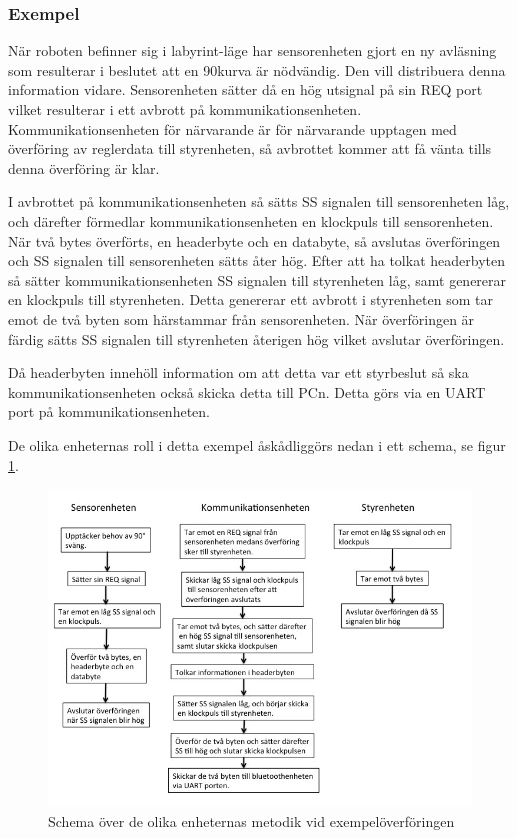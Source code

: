 \subsubsection{Exempel}

När roboten befinner sig i labyrint-läge har sensorenheten gjort en ny avläsning som resulterar i beslutet att en 90\degree kurva är nödvändig. Den vill distribuera denna information vidare. Sensorenheten sätter då en hög utsignal på sin REQ port vilket resulterar i ett avbrott på kommunikationsenheten. Kommunikationsenheten för närvarande är för närvarande upptagen med överföring av reglerdata till styrenheten, så avbrottet kommer att få vänta tills denna överföring är klar.

I avbrottet på kommunikationsenheten så sätts SS signalen till sensorenheten låg, och därefter förmedlar kommunikationsenheten en klockpuls till sensorenheten. När två bytes överförts, en headerbyte och en databyte, så avslutas överföringen och SS signalen till sensorenheten sätts åter hög. Efter att ha tolkat headerbyten så sätter kommunikationsenheten SS signalen till styrenheten låg, samt genererar en klockpuls till styrenheten. Detta genererar ett avbrott i styrenheten som tar emot de två byten som härstammar från sensorenheten. När överföringen är färdig sätts SS signalen till styrenheten återigen hög vilket avslutar överföringen. 

Då headerbyten innehöll information om att detta var ett styrbeslut så ska kommunikationsenheten också skicka detta till PCn. Detta görs via en UART port på kommunikationsenheten.

De olika enheternas roll i detta exempel åskådliggörs nedan i ett schema, se figur \ref{fig:schema}.


\begin{figure}[H]
 \centering
\includegraphics[angle=0,scale=0.7]{bilder/Schema_exempel.png}
  \caption{Schema över de olika enheternas metodik vid exempelöverföringen}
  \label{fig:schema}
\end{figure}

